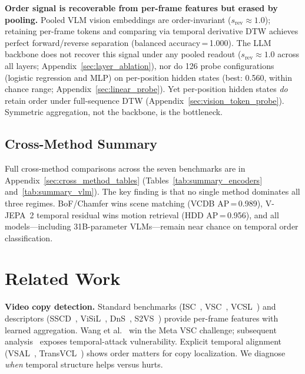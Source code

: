 \documentclass{article}
\theoremstyle{remark}
\begin{document}
\begin{table}[ht]
\begin{flushleft}
\end{flushleft}
\end{table}

\textbf{Order signal is recoverable from per-frame features but erased by pooling.} Pooled VLM vision embeddings are order-invariant ($s_\text{rev} \approx 1.0$); retaining per-frame tokens and comparing via temporal derivative DTW achieves perfect forward/reverse separation (balanced accuracy\,=\,1.000). The LLM backbone does not recover this signal under any pooled readout ($s_\text{rev} \approx 1.0$ across all layers; Appendix~\ref{sec:layer_ablation}), nor do 126 probe configurations (logistic regression and MLP) on per-position hidden states (best: 0.560, within chance range; Appendix~\ref{sec:linear_probe}). Yet per-position hidden states \emph{do} retain order under full-sequence DTW (Appendix~\ref{sec:vision_token_probe}). Symmetric aggregation, not the backbone, is the bottleneck.

\subsection{Cross-Method Summary}

Full cross-method comparisons across the seven benchmarks are in Appendix~\ref{sec:cross_method_tables} (Tables~\ref{tab:summary_encoders} and~\ref{tab:summary_vlm}). The key finding is that no single method dominates all three regimes. BoF/Chamfer wins scene matching (VCDB AP\,=\,0.989), V-JEPA~2 temporal residual wins motion retrieval (HDD AP\,=\,0.956), and all models---including 31B-parameter VLMs---remain near chance on temporal order classification.

\section{Related Work}
\label{sec:related_work}

\textbf{Video copy detection.} Standard benchmarks (ISC~\cite{douze2021isc}, VSC~\cite{pizzi2023vsc}, VCSL~\cite{he2022vcsl}) and descriptors (SSCD~\cite{pizzi2022sscd}, ViSiL~\cite{kordopatis2019visil}, DnS~\cite{kordopatis2022dns}, S2VS~\cite{s2vs}) provide per-frame features with learned aggregation. Wang et al.~\cite{wang2023duallevel} win the Meta VSC challenge; subsequent analysis~\cite{fojcik2025} exposes temporal-attack vulnerability. Explicit temporal alignment (VSAL~\cite{han2021vsal}, TransVCL~\cite{he2023transvcl}) shows order matters for copy localization. We diagnose \emph{when} temporal structure helps versus hurts.
\end{document}
